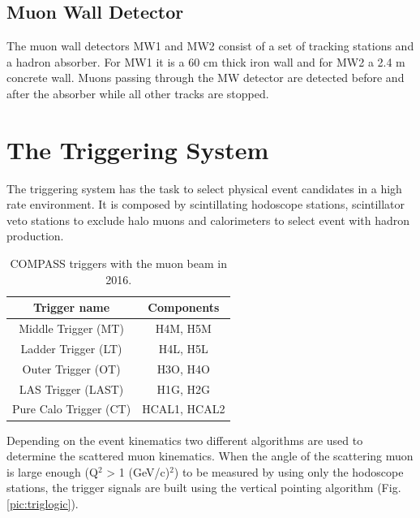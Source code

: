 \subsection{Muon Wall Detector}

The muon wall detectors MW1 and MW2 consist of a set of tracking stations and a hadron absorber. For MW1 it is a 60 cm thick iron wall and for MW2 a 2.4 m concrete wall.
Muons passing through the MW detector are detected before and after the absorber while all other tracks are stopped.


\section{The Triggering System}\label{sec:trigger}

The triggering system \cite{} has the task to select physical event candidates in a high rate environment. It is composed by scintillating hodoscope stations, scintillator veto stations to exclude halo muons and calorimeters to select event with hadron production.

\begin{table}[!h]
  \caption{COMPASS triggers with the muon beam in 2016.}
  \label{tab:kinvar}
  \centering
  \begin{tabularx}{7.5cm}{cc}
    \hline
    \hline
    Trigger name & Components \\
    \hline
    \hline
    Middle Trigger (MT) & H4M, H5M \\
    Ladder Trigger (LT) & H4L, H5L \\
    Outer Trigger (OT) & H3O, H4O \\
    LAS Trigger (LAST) & H1G, H2G \\
    Pure Calo Trigger (CT) & HCAL1, HCAL2 \\
    \hline
    \hline
  \end{tabularx}
\end{table}

Depending on the event kinematics two different algorithms are used to determine the scattered muon kinematics. When the angle of the scattering muon is large enough (Q$^2$ > 1 (GeV/c)$^2$) to be measured by using only the hodoscope stations, the trigger signals are built using the vertical pointing algorithm (Fig. \ref{pic:triglogic}).

